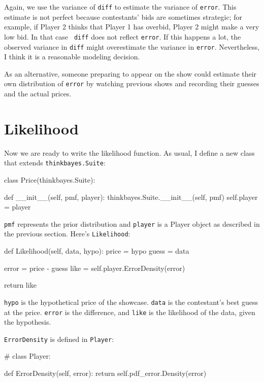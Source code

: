 \documentclass[12pt]{book}
\theoremstyle{exercise}
\begin{document}
Again, we use the variance of {\tt diff} to estimate the variance of
{\tt error}.  This estimate is not perfect because contestants' bids
are sometimes strategic; for example, if Player 2 thinks that Player 1
has overbid, Player 2 might make a very low bid.  In that case {\tt
  diff} does not reflect {\tt error}.  If this happens a lot, the
observed variance in {\tt diff} might overestimate the variance in
{\tt error}.  Nevertheless, I think it is a reasonable modeling
decision.

As an alternative, someone preparing to appear on the show could
estimate their own distribution of {\tt error} by watching previous shows
and recording their guesses and the actual prices.


\section{Likelihood}

Now we are ready to write the likelihood function.  As usual,
I define a new class that extends {\tt thinkbayes.Suite}:

\begin{code}
class Price(thinkbayes.Suite):

    def __init__(self, pmf, player):
        thinkbayes.Suite.__init__(self, pmf)
        self.player = player
\end{code}

{\tt pmf} represents the prior distribution and
{\tt player} is a Player object as described in the previous
section.  Here's {\tt Likelihood}:

\begin{code}
    def Likelihood(self, data, hypo):
        price = hypo
        guess = data

        error = price - guess
        like = self.player.ErrorDensity(error)

        return like
\end{code}

{\tt hypo} is the hypothetical price of the showcase.  {\tt data}
is the contestant's best guess at the price.  {\tt error} is
the difference, and {\tt like} is the likelihood of the data,
given the hypothesis.

{\tt ErrorDensity} is defined in {\tt Player}:

\begin{code}
# class Player:

    def ErrorDensity(self, error):
        return self.pdf_error.Density(error)
\end{code}
\end{document}
